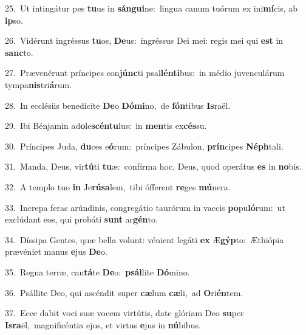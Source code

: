 {\numbfont\textcolor{\numbcolor}{25.}}~Ut intingátur pes \textbf{tu}\-us in \textbf{sán}\-\textbf{gui}ne:~\star lingua canum tuórum ex ini\-\textbf{mí}\-cis, ab \textbf{ip}\-so.\par
{\numbfont\textcolor{\numbcolor}{26.}}~Vidérunt ingréssus \textbf{tu}\-os, \textbf{De}\-us:~\star ingréssus Dei mei: regis mei qui \textbf{est} in \textbf{sanc}\-to.\par
{\numbfont\textcolor{\numbcolor}{27.}}~Prævenérunt príncipes con\-\textbf{júnc}\-ti psal\-\textbf{lén}\-\textbf{ti}bus:~\star in médio juvenculárum tympa\-\textbf{nis}\-tri\-\textbf{á}\-rum.\par
{\numbfont\textcolor{\numbcolor}{28.}}~In ecclésiis benedícite \textbf{De}\-o \textbf{Dó}\-\textbf{mi}no,~\star de \textbf{fón}\-tibus \textbf{Is}\-raël.\par
{\numbfont\textcolor{\numbcolor}{29.}}~Ibi Bénjamin ad\-\textbf{o}\-le\-\textbf{scén}\-\textbf{tu}lus:~\star in \textbf{men}\-tis ex\-\textbf{cés}\-su.\par
{\numbfont\textcolor{\numbcolor}{30.}}~Príncipes Juda, \textbf{du}\-ces e\-\textbf{ó}\-rum:~\star príncipes Zábulon, \textbf{prín}\-cipes \textbf{Néph}\-tali.\par
{\numbfont\textcolor{\numbcolor}{31.}}~Manda, Deus, vir\-\textbf{tú}\-ti \textbf{tu}\-æ:~\star confírma hoc, Deus, quod operátus \textbf{es} in \textbf{no}\-bis.\par
{\numbfont\textcolor{\numbcolor}{32.}}~A templo tuo \textbf{in} Je\-\textbf{rú}\-\textbf{sa}lem,~\star tibi ófferent \textbf{re}\-ges \textbf{mú}\-nera.\par
{\numbfont\textcolor{\numbcolor}{33.}}~Increpa feras arúndinis, congregátio taurórum in vaccis \textbf{po}\-pu\-\textbf{ló}\-rum:~\star ut exclúdant eos, qui probáti \textbf{sunt} ar\-\textbf{gén}\-to.\par
{\numbfont\textcolor{\numbcolor}{34.}}~Díssipa Gentes, quæ bella volunt: vénient legáti \textbf{ex} Æ\-\textbf{gýp}\-to:~\star Æthiópia prævéniet manus \textbf{e}\-jus \textbf{De}\-o.\par
{\numbfont\textcolor{\numbcolor}{35.}}~Regna terræ, can\-\textbf{tá}\-te \textbf{De}\-o:~\star \textbf{psál}\-lite \textbf{Dó}\-mino.\par
{\numbfont\textcolor{\numbcolor}{36.}}~Psállite Deo, qui ascéndit super \textbf{cæ}\-lum \textbf{cæ}\-li,~\star ad \textbf{O}\-ri\-\textbf{én}\-tem.\par
{\numbfont\textcolor{\numbcolor}{37.}}~Ecce dabit voci suæ vocem virtútis, date glóriam Deo \textbf{su}\-per \textbf{Is}\-\textbf{ra}ël,~\star magnificéntia ejus, et virtus \textbf{e}\-jus in \textbf{nú}\-bibus.\par

